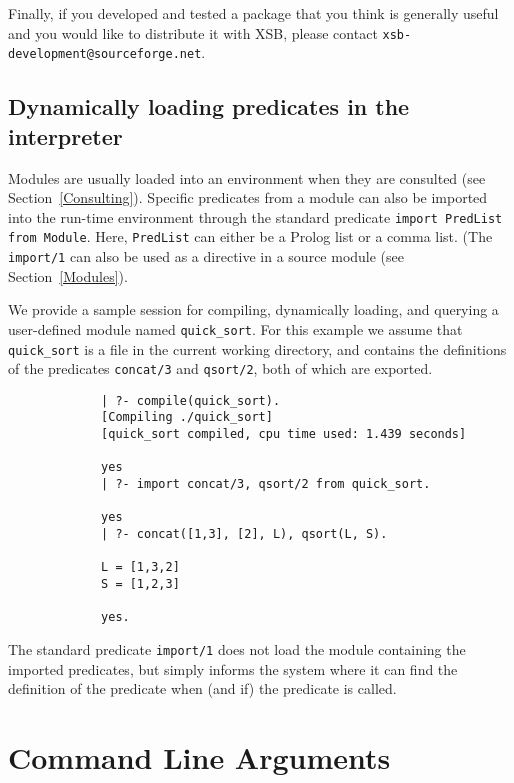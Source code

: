 Finally, if you developed and tested  a package that you think is
generally useful and you would like to distribute it with XSB, please
contact {\tt xsb-development@sourceforge.net}.


\subsection{Dynamically loading predicates in the interpreter}
Modules are usually loaded into an environment when they are consulted
(see Section~\ref{Consulting}).  Specific predicates from a module can
also be imported into the run-time environment through the standard
predicate {\tt import PredList from Module}.
Here, {\tt PredList} can either be a Prolog list or a comma list.
(The {\tt import/1} can also be used as a directive in a source module
(see Section~\ref{Modules}). 

We provide a sample session for compiling, dynamically loading, and 
querying a user-defined module named {\tt quick\_sort}.
For this example we assume that {\tt quick\_sort} is a file in the 
current working directory, and contains the definitions of the
predicates {\tt concat/3} and {\tt qsort/2}, both of which are exported.

{\footnotesize
\begin{verbatim}
             | ?- compile(quick_sort).
             [Compiling ./quick_sort]
             [quick_sort compiled, cpu time used: 1.439 seconds]

             yes
             | ?- import concat/3, qsort/2 from quick_sort. 

             yes
             | ?- concat([1,3], [2], L), qsort(L, S).

             L = [1,3,2]
             S = [1,2,3]

             yes.
\end{verbatim}
}

The standard predicate {\tt import/1} does not load the module 
containing the imported predicates, but simply informs the system 
where it can find the definition of the predicate when (and if) the
predicate is called.


\section{Command Line Arguments} \label{sec:EmuOptions}

